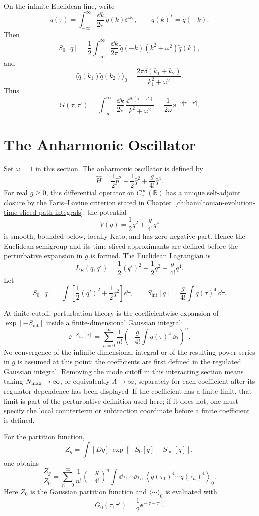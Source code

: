 On the infinite Euclidean line, write
\[
  q(\tau)=
  \int_{-\infty}^{\infty}\frac{\dd k}{2\pi}\,
  \widetilde q(k)\ee^{\ii k\tau},
  \qquad
  \widetilde q(k)^*=\widetilde q(-k).
\]
Then
\[
  S_0[q]
  =
  \frac12
  \int_{-\infty}^{\infty}\frac{\dd k}{2\pi}\,
  \widetilde q(-k)(k^2+\omega^2)\widetilde q(k),
\]
and
\[
  \langle \widetilde q(k_1)\widetilde q(k_2)\rangle_0
  =
  \frac{2\pi\delta(k_1+k_2)}{k_1^2+\omega^2}.
\]
Thus
\[
  G(\tau,\tau')
  =
  \int_{-\infty}^{\infty}
  \frac{\dd k}{2\pi}\,
  \frac{\ee^{\ii k(\tau-\tau')}}{k^2+\omega^2}
  =
  \frac{1}{2\omega}\ee^{-\omega|\tau-\tau'|}.
\]

\section{The Anharmonic Oscillator}

Set \(\omega=1\) in this section. The anharmonic oscillator is defined by
\[
  \widehat H
  =
  \frac12\widehat p^2+\frac12\widehat q^2+\frac{g}{4!}\widehat q^4.
\]
For real \(g\ge0\), this differential operator on \(C_c^\infty(\mathbb R)\)
has a unique self-adjoint closure by the Faris--Lavine criterion stated in
Chapter~\ref{ch:hamiltonian-evolution-time-sliced-path-integrals}: the
potential
\[
  V(q)=\frac12q^2+\frac{g}{4!}q^4
\]
is smooth, bounded below, locally Kato, and has zero negative part.  Hence the
Euclidean semigroup and its time-sliced approximants are defined before the
perturbative expansion in \(g\) is formed.
The Euclidean Lagrangian is
\[
  L_E(q,q')
  =
  \frac12(q')^2+\frac12q^2+\frac{g}{4!}q^4.
\]
Let
\[
  S_0[q]=\int\left[\frac12(q')^2+\frac12q^2\right]\dd\tau,
  \qquad
  S_{\mathrm{int}}[q]=\frac{g}{4!}\int q(\tau)^4\,\dd\tau .
\]
\begin{definition}
\label{def:anharmonic-cutoff-perturbative-expansion}
At finite cutoff, perturbation theory is the coefficientwise expansion of
\(\exp[-S_{\mathrm{int}}]\) inside a finite-dimensional Gaussian integral:
\[
  \ee^{-S_{\mathrm{int}}[q]}
  =
  \sum_{n=0}^{\infty}
  \frac{1}{n!}
  \left(-\frac{g}{4!}\int q(\tau)^4\,\dd\tau\right)^n .
\]
No convergence of the infinite-dimensional integral or of the resulting power
series in \(g\) is assumed at this point; the coefficients are first defined in
the regulated Gaussian integral.  Removing the mode cutoff in this interacting
section means taking \(N_{\rm max}\to\infty\), or equivalently
\(\Lambda\to\infty\), separately for each coefficient after its regulator
dependence has been displayed.  If the coefficient has a finite limit, that
limit is part of the perturbative definition used here; if it does not, one
must specify the local counterterm or subtraction coordinate before a finite
coefficient is defined.
\end{definition}
For the partition function,
\[
  Z_g=\int[Dq]\,\exp[-S_0[q]-S_{\mathrm{int}}[q]],
\]
one obtains
\[
  \frac{Z_g}{Z_0}
  =
  \sum_{n=0}^{\infty}
  \frac{1}{n!}
  \left(-\frac{g}{4!}\right)^n
  \int \dd\tau_1\cdots\dd\tau_n\,
  \left\langle
    q(\tau_1)^4\cdots q(\tau_n)^4
  \right\rangle_0 .
\]
Here \(Z_0\) is the Gaussian partition function and
\(\langle\cdots\rangle_0\) is evaluated with
\[
  G_0(\tau,\tau')=\frac12\ee^{-|\tau-\tau'|}.
\]

